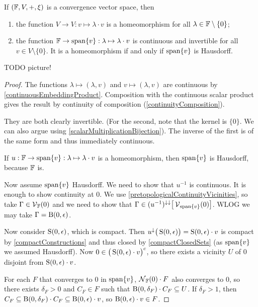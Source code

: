 \begin{lemma} \label{continuityLemmaVectorConvergence}
If $\sSet{\F,V,+, \xi}$ is a convergence vector space, then
\begin{enumerate}
\item the function $V \to V: v \mapsto \lambda\cdot v$ is a homeomorphism for all $\lambda\in \mathbb{F}\setminus\{0\}$;
\item the function $\mathbb{F} \to \operatorname{span}\{v\}: \lambda \mapsto \lambda\cdot v$ is continuous and invertible for all $v\in V\setminus\{0\}$. It is a homeomorphism \textup{if and only if} $\operatorname{span}\{v\}$ is Hausdorff.
\end{enumerate}
\end{lemma}
TODO picture!
\begin{proof}
The functions $\lambda \mapsto (\lambda, v)$ and $v \mapsto (\lambda, v)$ are continuous by \ref{continuousEmbeddingProduct}. Composition with the continuous scalar product gives the result by continuity of composition (\ref{continuityComposition}).

They are both clearly invertible. (For the second, note that the kernel is $\{0\}$. We can also argue using \ref{scalarMultiplicationBijection}). The inverse of the first is of the same form and thus immediately continuous.

If $u: \mathbb{F} \to \operatorname{span}\{v\}: \lambda \mapsto \lambda\cdot v$ is a homeomorphism, then $\operatorname{span}\{v\}$ is Hausdorff, because $\mathbb{F}$ is.

Now assume $\operatorname{span}\{v\}$ Hausdorff. We need to show that $u^{-1}$ is continuous. It is enough to show continuity at $0$. We use \ref{pretopologicalContinuityVicinities}, so take $\Gamma \in \operatorname{\mathcal{V}}_{\mathbb{F}}(0)$ and we need to show that $\Gamma \in (u^{-1})^{\downarrow\downarrow}\big[\operatorname{\mathcal{V}}_{\operatorname{span}\{v\}}(0)\big]$. WLOG we may take $\Gamma = \operatorname{B}(0, \epsilon)$.

Now consider $\operatorname{S}(0,\epsilon)$, which is compact. Then $u^{\downarrow}\big(\operatorname{S}(0,\epsilon)\big) = \operatorname{S}(0,\epsilon)\cdot v$ is compact by \ref{compactConstructions} and thus closed by \ref{compactClosedSets} (as $\operatorname{span}\{v\}$ we assumed Hausdorff). Now $0 \in \big(\operatorname{S}(0,\epsilon)\cdot v\big)^c$, so there exists a vicinity $U$ of $0$ disjoint from $\operatorname{S}(0,\epsilon)\cdot v$.

For each $F$ that converges to $0$ in $\operatorname{span}\{v\}$, $\operatorname{\mathcal{N}}_{\mathbb{F}}(0)\cdot F$ also converges to $0$, so there exists $\delta_F>0$ and $C_F\in F$ such that $\operatorname{B}(0, \delta_F)\cdot C_F \subseteq U$. If $\delta_F > 1$, then $C_F \subseteq \operatorname{B}(0, \delta_F)\cdot C_F \subseteq \operatorname{B}(0,\epsilon)\cdot v$, so $\operatorname{B}(0,\epsilon)\cdot v\in F$.


\end{proof}
